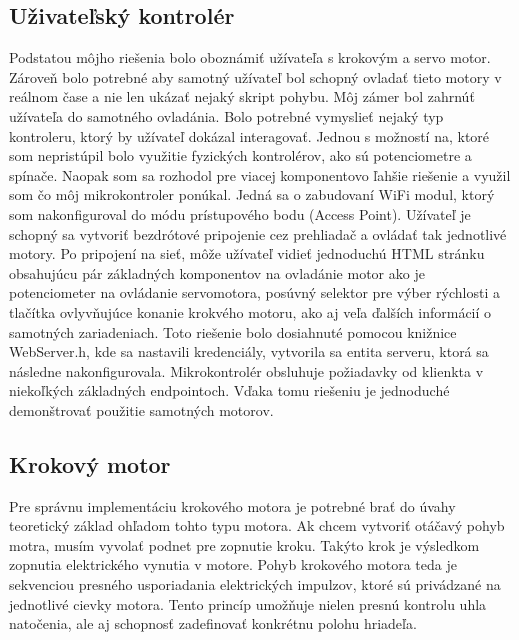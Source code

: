 \documentclass[a4paper, 11pt]{article}
\begin{document}
\subsection{Uživateľský kontrolér}
Podstatou môjho riešenia bolo oboznámiť užívateľa s krokovým a servo motor. Zároveň bolo potrebné aby samotný užívateľ bol schopný ovladať tieto motory v reálnom čase a nie len ukázať nejaký skript pohybu. Môj zámer bol zahrnúť užívateľa do samotného ovladánia. 
Bolo potrebné vymyslieť nejaký typ kontroleru, ktorý by užívateľ dokázal interagovať. Jednou s možností na, ktoré som nepristúpil bolo využitie fyzických kontrolérov, ako sú potenciometre a spínače. Naopak som sa rozhodol pre viacej komponentovo ľahšie riešenie a využil som čo môj mikrokontroler ponúkal. Jedná sa o zabudovaní WiFi modul, ktorý som nakonfiguroval do módu prístupového bodu (Access Point). Užívateľ je schopný sa vytvoriť bezdrótové pripojenie cez prehliadač a ovládať tak jednotlivé motory. 
Po pripojení na sieť, môže užívateľ vidieť jednoduchú HTML stránku obsahujúcu pár základných komponentov na ovladánie motor ako je potenciometer na ovládanie servomotora, posúvný selektor pre výber rýchlosti a tlačítka ovlyvňujúce konanie krokvého motoru, ako aj veľa ďalších informácií o samotných zariadeniach. Toto riešenie bolo dosiahnuté pomocou knižnice WebServer.h, kde sa nastavili kredenciály, vytvorila sa entita serveru, ktorá sa následne nakonfigurovala. Mikrokontrolér obsluhuje požiadavky od klienkta v niekoľkých základných endpointoch.
Vďaka tomu riešeniu je jednoduché demonštrovať použitie samotných motorov.

\subsection{Krokový motor}
Pre správnu implementáciu krokového motora je potrebné brať do úvahy teoretický základ ohľadom tohto typu motora. Ak chcem vytvoriť otáčavý pohyb motra, musím vyvolať podnet pre zopnutie kroku. Takýto krok je výsledkom zopnutia elektrického vynutia v motore. Pohyb krokového motora teda je sekvenciou presného usporiadania elektrických impulzov, ktoré sú privádzané na jednotlivé cievky motora. Tento princíp umožňuje nielen presnú kontrolu uhla natočenia, ale aj schopnosť zadefinovať konkrétnu polohu hriadeľa.
\end{document}
